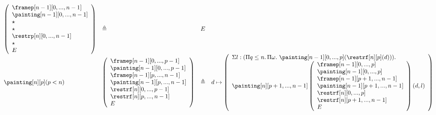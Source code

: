 \documentclass{msc}
\newcommand{\defeq}{\ensuremath{\triangleq}}
\begin{document}
\begin{itemize}
$$\begin{array}{llcl}
            \left(\begin{array}{l}
                      \framep[n-1][0,...,n-1] \\
                      \painting[n-1][0,...,n-1] \\
                      \star \\
                      \star \\
                      \restrp[n][0,...,n-1] \\
                      \star \\
                      E \\
                    \end{array}\right)                                     & \defeq & E \\
            \painting[n][p](p<n)                                   &
                                \left(\begin{array}{l}
                                    \framep[n-1][0,...,p-1]  \\
                                    \painting[n-1][0,...,p-1] \\
                                    \framep[n-1][p,...,n-1]  \\
                                    \painting[n-1][p,...,n-1] \\
                                    \restrf[n][0,...,p-1] \\
                                    \restrf[n][p,...,n-1] \\
                                    E \\
                                  \end{array}\right) & \defeq & d \mapsto
            \left(\begin{array}{l}
              \Sigma l:(\Pi q\leq n.\,\Pi \omega.\
                      \painting[n-1][0,...,p](\restrf[n][p](d))). \\
                      \painting[n][p+1,...,n-1]
                      \left(\begin{array}{l}
                                    \framep[n-1][0,...,p]  \\
                                    \painting[n-1][0,...,p] \\
                                    \framep[n-1][p+1,...,n-1]  \\
                                    \painting[n-1][p+1,...,n-1] \\
                                    \restrf[n][0,...,p] \\
                                    \restrf[n][p+1,...,n-1] \\
                                    E \\
                        \end{array}\right)(d,l) \\
                    \end{array}\right)                    \\
          \end{array}
          $$


\end{itemize}
\end{document}
